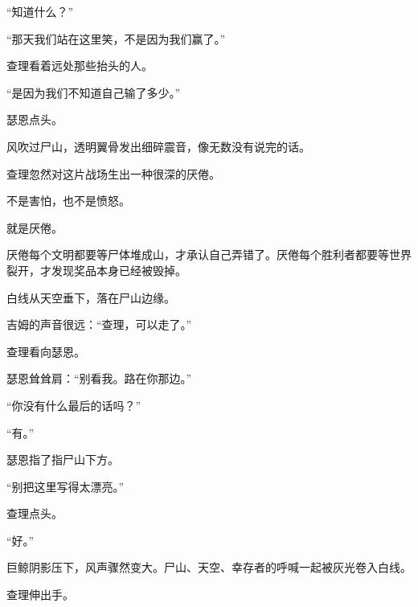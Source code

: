 “知道什么？”

“那天我们站在这里笑，不是因为我们赢了。”

查理看着远处那些抬头的人。

“是因为我们不知道自己输了多少。”

瑟恩点头。

风吹过尸山，透明翼骨发出细碎震音，像无数没有说完的话。

查理忽然对这片战场生出一种很深的厌倦。

不是害怕，也不是愤怒。

就是厌倦。

厌倦每个文明都要等尸体堆成山，才承认自己弄错了。厌倦每个胜利者都要等世界裂开，才发现奖品本身已经被毁掉。

白线从天空垂下，落在尸山边缘。

吉姆的声音很远：“查理，可以走了。”

查理看向瑟恩。

瑟恩耸耸肩：“别看我。路在你那边。”

“你没有什么最后的话吗？”

“有。”

瑟恩指了指尸山下方。

“别把这里写得太漂亮。”

查理点头。

“好。”

巨鲸阴影压下，风声骤然变大。尸山、天空、幸存者的呼喊一起被灰光卷入白线。

查理伸出手。
